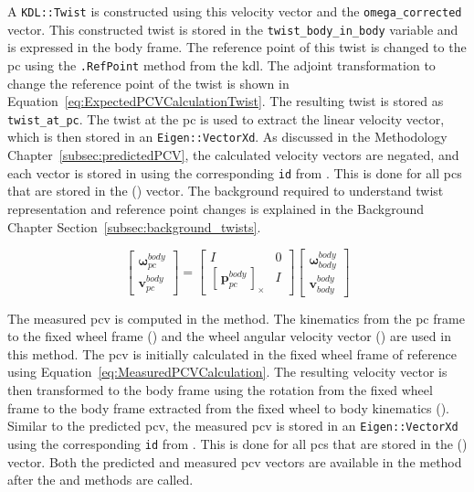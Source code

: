 \documentclass[report.tex]{subfiles}
\begin{document}
    A \texttt{KDL::Twist} is constructed using this velocity vector and the \texttt{omega\_corrected} vector. This constructed twist is stored in the \texttt{twist\_body\_in\_body} variable and is expressed in the body frame. The reference point of this twist is changed to the \gls{pc} using the \texttt{.RefPoint} method from the \gls{kdl}. The adjoint transformation to change the reference point of the twist is shown in Equation~\ref{eq:ExpectedPCVCalculationTwist}. The resulting twist is stored as \texttt{twist\_at\_pc}. The twist at the \gls{pc} is used to extract the linear velocity vector, which is then stored in an \texttt{Eigen::VectorXd}. As discussed in the Methodology Chapter~\ref{subsec:predictedPCV}, the calculated velocity vectors are negated, and each vector is stored in  using the corresponding \texttt{id} from . This is done for all \glspl{pc} that are stored in the () vector. The background required to understand twist representation and reference point changes is explained in the Background Chapter Section~\ref{subsec:background_twists}.
    
    \begin{equation}
        \begin{bmatrix}
        \boldsymbol{\omega}_{pc}^{body} \\
        \mathbf{v}_{pc}^{body}
        \end{bmatrix}
        =
        \begin{bmatrix}
        I & 0 \\
        \left[\,\mathbf{p}_{pc}^{body}\,\right]_\times & I
        \end{bmatrix}
        \begin{bmatrix}
        \boldsymbol{\omega}_{body}^{body} \\
        \mathbf{v}_{body}^{body}
        \end{bmatrix}
        \label{eq:ExpectedPCVCalculationTwist}            
    \end{equation}
    
    The measured \gls{pcv} is computed in the  method. The kinematics from the \gls{pc} frame to the fixed wheel frame () and the wheel angular velocity vector () are used in this method. The \gls{pcv} is initially calculated in the fixed wheel frame of reference using Equation~\ref{eq:MeasuredPCVCalculation}. The resulting velocity vector is then transformed to the body frame using the rotation from the fixed wheel frame to the body frame extracted from the fixed wheel to body kinematics (). Similar to the predicted \gls{pcv}, the measured \gls{pcv} is stored in an \texttt{Eigen::VectorXd} using the corresponding \texttt{id} from . This is done for all \glspl{pc} that are stored in the () vector. Both the predicted and measured \gls{pcv} vectors are available in the  method after the  and  methods are called. 
    
\end{document}

